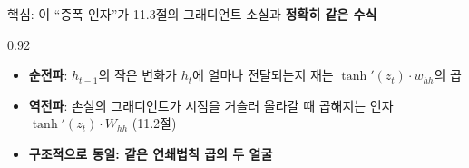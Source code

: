 \begin{frame}{핵심: 이 ``증폭 인자''가 11.3절의 그래디언트 소실과
\textbf{정확히 같은 수식}}
\begin{center}\begin{varwidth}{0.92\textwidth}
  \begin{itemize}
    \item \textbf{순전파}: $h_{t-1}$의 작은 변화가 $h_t$에 얼마나
      전달되는지 재는 $\tanh'(z_t) \cdot w_{hh}$의 곱
    \item \textbf{역전파}: 손실의 그래디언트가 시점을 거슬러 올라갈
      때 곱해지는 인자 $\tanh'(z_t) \cdot W_{hh}$ (11.2절)
    \item \textbf{구조적으로 동일: 같은 연쇄법칙 곱의 두 얼굴}
    
  \end{itemize}
\end{varwidth}\end{center}
\end{frame}

